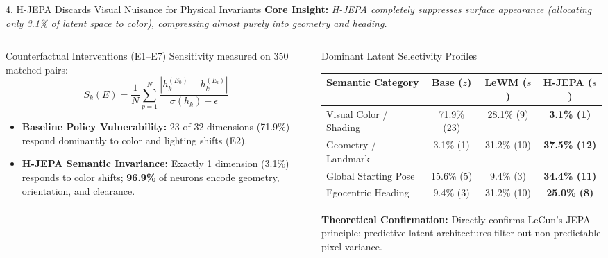 \documentclass[aspectratio=169, 10pt]{beamer}
\begin{document}
\begin{frame}{4. H-JEPA Discards Visual Nuisance for Physical Invariants}
  \textbf{Core Insight:} \textit{H-JEPA completely suppresses surface appearance (allocating only 3.1\% of latent space to color), compressing almost purely into geometry and heading.}

  \vspace{0.2cm}
  \begin{columns}[T]
    \begin{column}{0.48\textwidth}
      \begin{block}{Counterfactual Interventions (E1--E7)}
        \small
        Sensitivity measured on 350 matched pairs:
        \begin{equation*}
          S_k(E) = \frac{1}{N} \sum_{p=1}^N \frac{|h_k^{(E_0)} - h_k^{(E_i)}|}{\sigma(h_k) + \epsilon}
        \end{equation*}
        \begin{itemize}
          \item \textbf{Baseline Policy Vulnerability:} 23 of 32 dimensions (\alert{71.9\%}) respond dominantly to color and lighting shifts (E2).
          \item \textbf{H-JEPA Semantic Invariance:} Exactly 1 dimension (3.1\%) responds to color shifts; \textbf{96.9\%} of neurons encode geometry, orientation, and clearance.
        \end{itemize}
      \end{block}
    \end{column}

    \begin{column}{0.48\textwidth}
      \begin{block}{Dominant Latent Selectivity Profiles}
        \scriptsize
        \centering
        \setlength{\tabcolsep}{2.5pt}
        \begin{tabular}{lccc}
          \toprule
          \textbf{Semantic Category} & \textbf{Base ($z$)} & \textbf{LeWM ($s$)} & \textbf{H-JEPA ($s$)} \\
          \midrule
          Visual Color / Shading & \alert{71.9\%} (23) & 28.1\% (9) & \textbf{3.1\% (1)} \\
          Geometry / Landmark & 3.1\% (1) & 31.2\% (10) & \textbf{37.5\% (12)} \\
          Global Starting Pose & 15.6\% (5) & 9.4\% (3) & \textbf{34.4\% (11)} \\
          Egocentric Heading & 9.4\% (3) & 31.2\% (10) & \textbf{25.0\% (8)} \\
          \bottomrule
        \end{tabular}
      \end{block}
      \vspace{0.05cm}
      \scriptsize \textbf{Theoretical Confirmation:} Directly confirms LeCun's JEPA principle: predictive latent architectures filter out non-predictable pixel variance.
    \end{column}
  \end{columns}
\end{frame}
\end{document}
